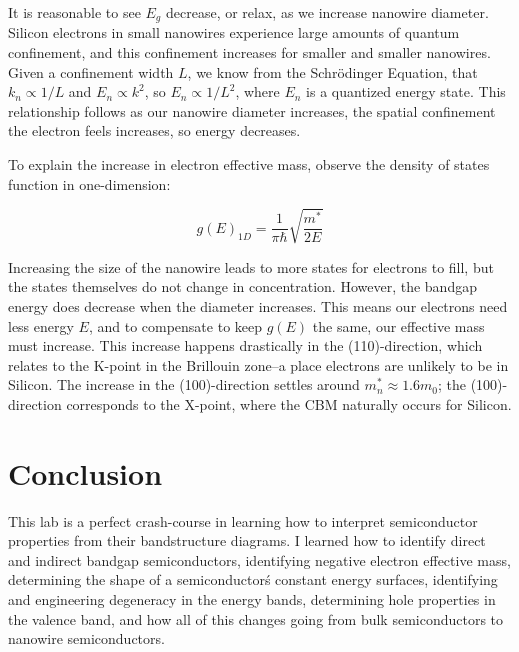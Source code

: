 \documentclass{IEEEtran}
\begin{document}
It is reasonable to see \(E_g\) decrease, or relax, as we increase nanowire diameter. Silicon electrons in small nanowires experience large amounts of quantum confinement, and this confinement increases for smaller and smaller nanowires. Given a confinement width \(L\), we know from the Schr\"{o}dinger Equation, that \(k_n \propto 1/L\) and \(E_n \propto k^2 \), so \(E_n \propto 1 / L^2\), where \(E_n\) is a quantized energy state. This relationship follows as our nanowire diameter increases, the spatial confinement the electron feels increases, so energy decreases.

To explain the increase in electron effective mass, observe the density of states function in one-dimension:

\begin{equation}\label{eq:dos-1D}
    g(E)_{1D} = \frac{1}{\pi\hbar} \sqrt{\frac{m^*}{2E}}
\end{equation}

Increasing the size of the nanowire leads to more states for electrons to fill, but the states themselves do not change in concentration. However, the bandgap energy does decrease when the diameter increases. This means our electrons need less energy \(E\), and to compensate to keep \(g(E)\) the same, our effective mass must increase. This increase happens drastically in the (110)-direction, which relates to the K-point in the Brillouin zone--a place electrons are unlikely to be in Silicon. The increase in the (100)-direction settles around \(m_n^* \approx 1.6m_0\); the (100)-direction corresponds to the X-point, where the CBM naturally occurs for Silicon.

\section{Conclusion}

This lab is a perfect crash-course in learning how to interpret semiconductor properties from their bandstructure diagrams. I learned how to identify direct and indirect bandgap semiconductors, identifying negative electron effective mass, determining the shape of a semiconductor\'s constant energy surfaces, identifying and engineering degeneracy in the energy bands, determining hole properties in the valence band, and how all of this changes going from bulk semiconductors to nanowire semiconductors.



\end{document}
